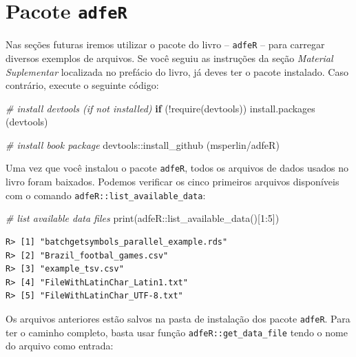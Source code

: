 \documentclass[
  11pt,
]{book}
\newenvironment{Shaded}{\begin{snugshade}}{\end{snugshade}}
\newcommand{\CommentTok}[1]{\textcolor[rgb]{0.37,0.37,0.37}{\textit{#1}}}
\newcommand{\ControlFlowTok}[1]{\textcolor[rgb]{0.27,0.27,0.27}{\textbf{#1}}}
\newcommand{\DecValTok}[1]{\textcolor[rgb]{0.06,0.06,0.06}{#1}}
\newcommand{\FunctionTok}[1]{\textcolor[rgb]{0,0,0}{#1}}
\newcommand{\NormalTok}[1]{#1}
\newcommand{\SpecialCharTok}[1]{\textcolor[rgb]{0,0,0}{#1}}
\newcommand{\StringTok}[1]{\textcolor[rgb]{0.5,0.5,0.5}{#1}}
\begin{document}
\hypertarget{pacote-adfer}{%
\section{\texorpdfstring{Pacote \texttt{adfeR}}{Pacote adfeR}}\label{pacote-adfer}}

Nas seções futuras iremos utilizar o pacote do livro -- \texttt{adfeR} -- para carregar diversos exemplos de arquivos. Se você seguiu as instruções da seção \emph{Material Suplementar} localizada no prefácio do livro, já deves ter o pacote instalado. Caso contrário, execute o seguinte código:

\begin{Shaded}
\begin{Highlighting}[]
\CommentTok{\# install devtools (if not installed)}
\ControlFlowTok{if}\NormalTok{ (}\SpecialCharTok{!}\FunctionTok{require}\NormalTok{(devtools)) }\FunctionTok{install.packages}\NormalTok{ (}\StringTok{\textquotesingle{}devtools\textquotesingle{}}\NormalTok{)}

\CommentTok{\# install book package}
\NormalTok{devtools}\SpecialCharTok{::}\FunctionTok{install\_github}\NormalTok{ (}\StringTok{\textquotesingle{}msperlin/adfeR\textquotesingle{}}\NormalTok{)}
\end{Highlighting}
\end{Shaded}

Uma vez que você instalou o pacote \texttt{adfeR}, todos os arquivos de dados usados no livro foram baixados. Podemos verificar os cinco primeiros arquivos disponíveis com o comando \texttt{adfeR::list\_available\_data}:

\begin{Shaded}
\begin{Highlighting}[]
\CommentTok{\# list available data files}
\FunctionTok{print}\NormalTok{(adfeR}\SpecialCharTok{::}\FunctionTok{list\_available\_data}\NormalTok{()[}\DecValTok{1}\SpecialCharTok{:}\DecValTok{5}\NormalTok{])}
\end{Highlighting}
\end{Shaded}

\begin{verbatim}
R> [1] "batchgetsymbols_parallel_example.rds"
R> [2] "Brazil_footbal_games.csv"            
R> [3] "example_tsv.csv"                     
R> [4] "FileWithLatinChar_Latin1.txt"        
R> [5] "FileWithLatinChar_UTF-8.txt"
\end{verbatim}

Os arquivos anteriores estão salvos na pasta de instalação dos pacote \texttt{adfeR}. Para ter o caminho completo, basta usar função \texttt{adfeR::get\_data\_file} tendo o nome do arquivo como entrada:
\end{document}
